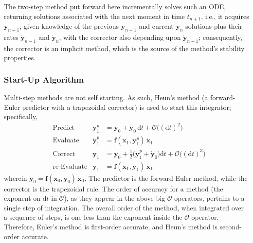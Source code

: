 The two-step method put forward here incrementally solves such an ODE, returning solutions associated with the next moment in time $t_{n+1}$, i.e., it acquires $\mathbf{y}_{n+1}$, given knowledge of the  previous $\mathbf{y}_{n-1}$ and current $\mathbf{y}_n$ solutions plus their rates $\dot{\mathbf{y}}_{n-1}$ and $\dot{\mathbf{y}}_n$, with the corrector also depending upon $\dot{\mathbf{y}}_{n+1}$; consequently, the corrector is an implicit method, which is the source of the method's stability properties.

\subsubsection{Start-Up Algorithm}

Multi-step methods are not self starting.  As such, Heun's method (a forward-Euler predictor with a trapezoidal corrector) is used to start this integrator; specifically,
\begin{subequations}
    \label{startUp1stOrderODEs}
    \begin{align}
    \mbox{} & \text{Predict} & 
    \mathbf{y}_1^p & = \mathbf{y}_0 + \dot{\mathbf{y}}_0 \, \mathrm{d}t + 
    \mathcal{O} \bigl( (\mathrm{d}t)^2 \bigr)
    \label{startUp1stOrderPredictor} \\
    \mbox{} & \text{Evaluate} & 
    \dot{\mathbf{y}}^p_1 & = \mathbf{f} (\mathbf{x}_1 , \mathbf{y}_1^p) \, 
    \dot{\mathbf{x}}_1
    \label{startUp1stEvaluate} \\
    \mbox{} & \text{Correct} &
    \mathbf{y}_1 & = \mathbf{y}_0 + \tfrac{1}{2} 
    \bigl( \dot{\mathbf{y}}_1^p + \dot{\mathbf{y}}_0 \bigr) \mathrm{d}t + 
    \mathcal{O} \bigl( (\mathrm{d}t)^3 \bigr)
    \label{startUp1stOrderCorrector} \\
    \mbox{} & \text{re-Evaluate} & 
    \dot{\mathbf{y}}_1 & = \mathbf{f} (\mathbf{x}_1 , \mathbf{y}_1) \,
    \dot{\mathbf{x}}_1 
    \label{startUp1stReEvaluate}
    \end{align}
\end{subequations}
wherein $\dot{\mathbf{y}}_0 = \mathbf{f}(\mathbf{x}_0, \mathbf{y}_0) \, \dot{\mathbf{x}}_0$.  The predictor is the forward Euler method, while the corrector is the trapezoidal rule.  The order of accuracy for a method (the exponent on $\mathrm{d}t$ in $\mathcal{O}$), as they appear in the above big $\mathcal{O}$ operators, pertains to a single step of integration.  The overall order of the method, when integrated over a sequence of steps, is one less than the exponent inside the $\mathcal{O}$ operator.  Therefore, Euler's method is first-order accurate, and Heun's method is second-order accurate.

